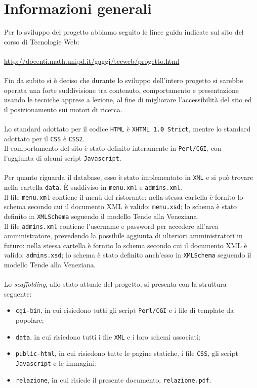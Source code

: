 \documentclass[../relazione.tex]{subfiles}
\begin{document}
\section{Informazioni generali}
	Per lo sviluppo del progetto abbiamo seguito le linee guida indicate sul sito del corso di Tecnologie Web:
	\\\\\url{http://docenti.math.unipd.it/gaggi/tecweb/progetto.html}
	\\\\Fin da subito si è deciso che durante lo sviluppo dell'intero progetto si sarebbe operata una forte suddivisione tra contenuto, comportamento e presentazione usando le tecniche apprese a lezione, al fine di migliorare l'accessibilità del sito ed il posizionamento sui motori di ricerca.\\\\
	Lo standard adottato per il codice \texttt{HTML} è \texttt{XHTML 1.0 Strict}, mentre lo standard adottato per il \texttt{CSS} è \texttt{CSS2}.\\
	Il comportamento del sito è stato definito interamente in \texttt{Perl/CGI}, con l'aggiunta di alcuni script \texttt{Javascript}.\\\\
	Per quanto riguarda il database, esso è stato implementato in \texttt{XML} e si può trovare nella cartella \texttt{data}. È suddiviso in \texttt{menu.xml} e \texttt{admins.xml}.\\
	Il file \texttt{menu.xml} contiene il menù del ristorante: nella stessa cartella è fornito lo schema secondo cui il documento XML è valido: \texttt{menu.xsd}; lo schema è stato definito in \texttt{XMLSchema} seguendo il modello Tende alla Veneziana.\\
	Il file \texttt{admins.xml} contiene l'username e password per accedere all'area amministratore, prevedendo la possibile aggiunta di ulteriori amministratori in futuro: nella stessa cartella è fornito lo schema secondo cui il documento XML è valido: \texttt{admins.xsd}; lo schema è stato definito anch'esso in \texttt{XMLSchema} seguendo il modello Tende alla Veneziana.\\\\
	Lo \textit{scaffolding}, allo stato attuale del progetto, si presenta con la struttura seguente:
	\begin{itemize}
		\item \texttt{cgi-bin}, in cui risiedono tutti gli script \texttt{Perl/CGI} e i file di template da popolare;
		\item \texttt{data}, in cui risiedono tutti i file \texttt{XML} e i loro schemi associati;
		\item \texttt{public-html}, in cui risiedono tutte le pagine statiche, i file \texttt{CSS}, gli script \texttt{Javascript} e le immagini;
		\item \texttt{relazione}, in cui risiede il presente documento, \texttt{relazione.pdf}.
	\end{itemize}
\end{document}
